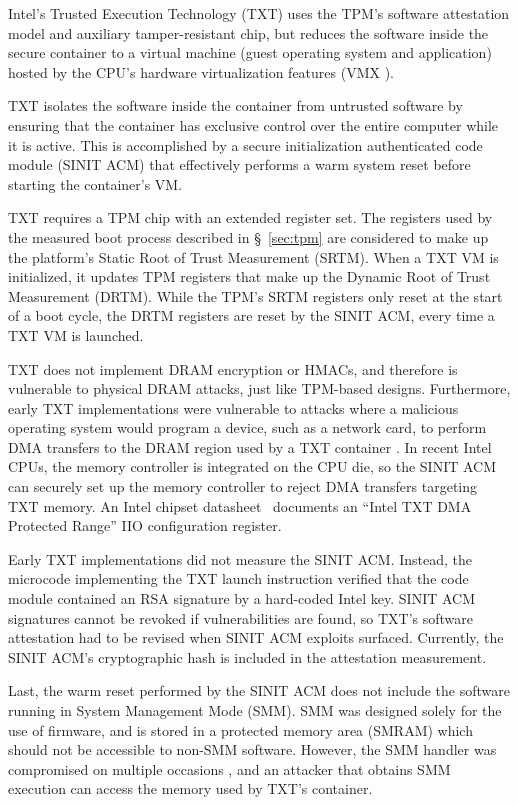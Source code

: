 \label{sec:intel_txt}

Intel's Trusted Execution Technology (TXT) \cite{grawrock2009txt} uses the
TPM's software attestation model and auxiliary tamper-resistant chip, but
reduces the software inside the secure container to a virtual machine (guest
operating system and application) hosted by the CPU's hardware virtualization
features (VMX \cite{uhlig2005vmx}).

TXT isolates the software inside the container from untrusted software by
ensuring that the container has exclusive control over the entire computer
while it is active. This is accomplished by a secure initialization
authenticated code module (SINIT ACM) that effectively performs a warm system
reset before starting the container's VM.

TXT requires a TPM chip with an extended register set. The registers used by
the measured boot process described in \S~\ref{sec:tpm} are considered to make
up the platform's Static Root of Trust Measurement (SRTM). When a TXT VM is
initialized, it updates TPM registers that make up the Dynamic Root of Trust
Measurement (DRTM). While the TPM's SRTM registers only reset at the start of a
boot cycle, the DRTM registers are reset by the SINIT ACM, every time a TXT VM
is launched.

TXT does not implement DRAM encryption or HMACs, and therefore is vulnerable to
physical DRAM attacks, just like TPM-based designs. Furthermore, early TXT
implementations were vulnerable to attacks where a malicious operating system
would program a device, such as a network card, to perform DMA transfers
to the DRAM region used by a TXT container \cite{wojtczuk2009txt,
wojtczuk2009txt2}. In recent Intel CPUs, the memory controller is integrated on
the CPU die, so the SINIT ACM can securely set up the memory controller to
reject DMA transfers targeting TXT memory. An Intel chipset
datasheet~\cite{intel2015datasheet} documents an ``Intel TXT DMA Protected
Range'' IIO configuration register.

Early TXT implementations did not measure the SINIT ACM. Instead, the microcode
implementing the TXT launch instruction verified that the code module contained
an RSA signature by a hard-coded Intel key. SINIT ACM signatures cannot be
revoked if vulnerabilities are found, so TXT's software attestation had to be
revised when SINIT ACM exploits \cite{wojtczuk2011txt} surfaced. Currently, the
SINIT ACM's cryptographic hash is included in the attestation measurement.

Last, the warm reset performed by the SINIT ACM does not include the software
running in System Management Mode (SMM). SMM was designed
solely for the use of firmware, and is stored in a protected memory area
(SMRAM) which should not be accessible to non-SMM software. However, the SMM
handler was compromised on multiple occasions \cite{duflot2006smm,
rutkowska2008remap, wojtczuk2009smm, wecherowski2009smm, embleton2010smm}, and
an attacker that obtains SMM execution can access the memory used by TXT's
container.
